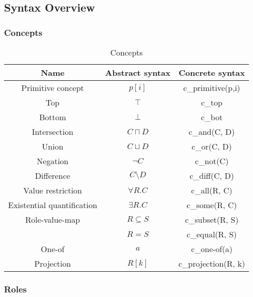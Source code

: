 \documentclass{article}
\begin{document}
\subsection{Syntax Overview}

\subsubsection{Concepts}

\begin{table}[H]
    \centering
    \begin{tabular}{ccc}
    Name & Abstract syntax & Concrete syntax \\
    \hline
    Primitive concept & $p[i]$ & c\_primitive(p,i) \\
    Top & $\top$ & c\_top \\
    Bottom & $\bot$ & c\_bot \\
    Intersection & $C\sqcap D$ & c\_and(C, D) \\
    Union & $C\sqcup D$ & c\_or(C, D) \\
    Negation & $\neg C$ & c\_not(C) \\
    Difference & $C\setminus D$ & c\_diff(C, D) \\
    Value restriction & $\forall R.C$ & c\_all(R, C) \\
    Existential quantification & $\exists R.C$ & c\_some(R, C) \\
    Role-value-map & $R\subseteq S$ & c\_subset(R, S) \\
     & $R = S$ & c\_equal(R, S) \\
    One-of & $a$ & c\_one-of(a) \\
    Projection & $R[k]$ & c\_projection(R, k) \\
    \end{tabular}
    \caption{Concepts}
\end{table}

\subsubsection{Roles}
\end{document}
